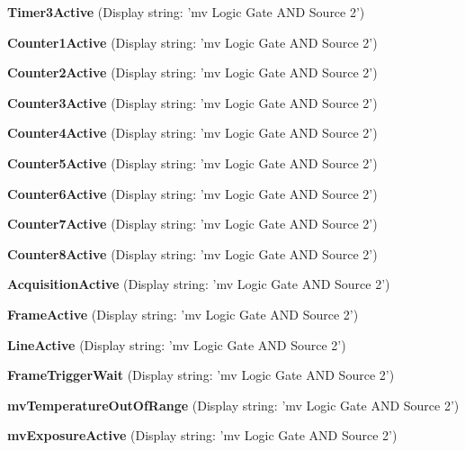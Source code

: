 \begin{DoxyItemize}
\item {\bfseries Timer3\+Active} (Display string\+: 'mv Logic Gate A\+N\+D Source 2')
\item {\bfseries Counter1\+Active} (Display string\+: 'mv Logic Gate A\+N\+D Source 2')
\item {\bfseries Counter2\+Active} (Display string\+: 'mv Logic Gate A\+N\+D Source 2')
\item {\bfseries Counter3\+Active} (Display string\+: 'mv Logic Gate A\+N\+D Source 2')
\item {\bfseries Counter4\+Active} (Display string\+: 'mv Logic Gate A\+N\+D Source 2')
\item {\bfseries Counter5\+Active} (Display string\+: 'mv Logic Gate A\+N\+D Source 2')
\item {\bfseries Counter6\+Active} (Display string\+: 'mv Logic Gate A\+N\+D Source 2')
\item {\bfseries Counter7\+Active} (Display string\+: 'mv Logic Gate A\+N\+D Source 2')
\item {\bfseries Counter8\+Active} (Display string\+: 'mv Logic Gate A\+N\+D Source 2')
\item {\bfseries Acquisition\+Active} (Display string\+: 'mv Logic Gate A\+N\+D Source 2')
\item {\bfseries Frame\+Active} (Display string\+: 'mv Logic Gate A\+N\+D Source 2')
\item {\bfseries Line\+Active} (Display string\+: 'mv Logic Gate A\+N\+D Source 2')
\item {\bfseries Frame\+Trigger\+Wait} (Display string\+: 'mv Logic Gate A\+N\+D Source 2')
\item {\bfseries mv\+Temperature\+Out\+Of\+Range} (Display string\+: 'mv Logic Gate A\+N\+D Source 2')
\item {\bfseries mv\+Exposure\+Active} (Display string\+: 'mv Logic Gate A\+N\+D Source 2')
\end{DoxyItemize}

